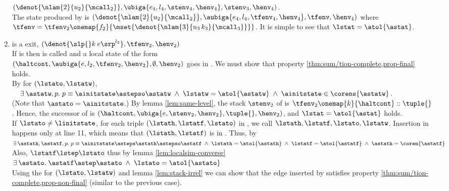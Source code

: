 \documentclass{LMCS}
\theoremstyle{definition} \newtheorem{property}[thm]{Property}
\begin{document}
\begin{enumerate}[$\bullet$]
  $(\denot{\nlam{2}{u_2}{\mcall_2}}, \ubiga{e_4, l_4, \stenv_4, \henv_4}, 
  \stenv_3, \henv_4)$. \\
  The state \lstat{} produced by  is 
  $(\denot{\nlam{2}{u_2}{\mcall_2}}, \aubiga{e_4, l_4, \tfenv_4, \henv_4}, 
  \tfenv, \henv_4)$ where $\tfenv = 
  \tfenv_2\onemap{f_2}{\mset{\denot{\nlam{3}{u_3 \, k_3}{\mcall_3}}}}$.
  It is simple to see that $\lstat = \atol{\astat}$.
\item
  \lstatw{} is a \dlceval{} exit, 
  $(\denot{\slp{}k \: e\srp^{l_2}}, \tfenv_2, \henv_2)$ \\
  If \lstato{} is \linitstate{} then \lstatw\srp{} is called
  and a local state \lstat{} of the form \\
  $(\haltcont, \aubiga{e, l_2, \tfenv_2, \henv_2}, \emptyset, \henv_2)$
  goes in \finals.
  We must show that property \ref{thm:sum/tion-complete,prop-final} holds. \\
  By \ih{} for $(\lstato, \lstatw)$,
  $\quad \exists \: \astatw, p. \;
  p \equiv \ainitstate \astepso \astatw 
  \;\land\; \lstatw = \atol{\astatw}
  \;\land\; \ainitstate \in \corens{\astatw}$. \\
  (Note that $\astato = \ainitstate$.)
  By lemma \ref{lem:same-level}, the stack $\stenv_2$ of \astatw{} is
  $\tfenv_2\onemap{k}{\haltcont}::\tuple{}$.
  Hence, the successor \astat{} of \astatw{} is 
  $(\haltcont, \ubiga{e, \stenv_2, \henv_2}, \tuple{}, \henv_2)$,
  and $\lstat = \atol{\astat}$ holds.
  \\
  If $\lstato \neq \linitstate$,
  for each triple $(\lstath, \lstatf, \lstato)$ in \callers{}, 
  we call $\lstath, \lstatf, \lstato, \lstatw$\srp{}.
  Insertion in \callers{} happens only at line 11, which means that
  $(\lstath, \lstatf)$ is in \seen.
  Thus, by \ih{} \\
  $\exists \: \astath, \astatf, p. \;
  p \equiv \ainitstate \asteps \astath \astepso \astatf
  \;\land\; \lstath = \atol{\astath}
  \;\land\; \lstatf = \atol{\astatf}
  \;\land\; \astath = \coren{\astatf}$ \\
  Also, $\lstatf \lstep \lstato$ thus by lemma \ref{lem:localsim-converse}
  $\exists \: \astato. \; 
  \astatf \astep \astato
  \;\land\; \lstato = \atol{\astato}$ \\
  Using the \ih{} for $(\lstato, \lstatw)$ and lemma \ref{lem:stack-irrel}
  we can show that the edge inserted by  satisfies 
  property \ref{thm:sum/tion-complete,prop-non-final} (similar to the previous
  case).
  \\

\end{enumerate}
\end{document}
